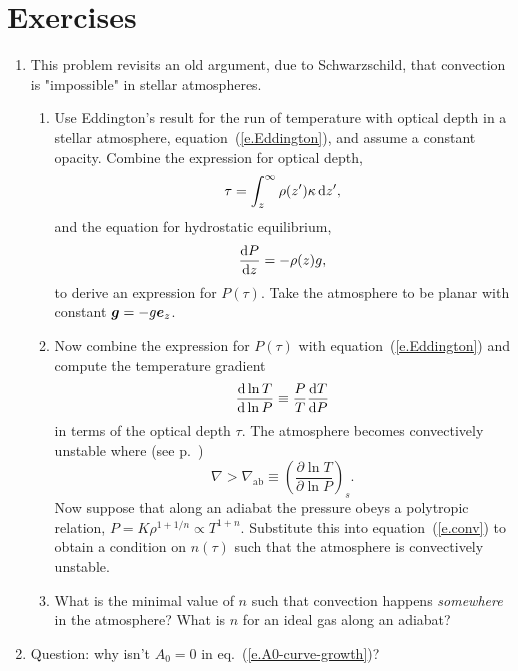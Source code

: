 \section{Exercises}
\begin{enumerate}
\item This problem revisits an old argument, due to Schwarzschild, that convection is "impossible" in stellar atmospheres.  
\begin{enumerate}
\item Use Eddington's result for the run of temperature with optical depth in a stellar atmosphere, equation~(\ref{e.Eddington}), 
and assume a constant opacity. Combine the expression for optical depth,
\[ \tau = \int_{z}^{\infty}\rho(z')\kappa\, \mathrm{d} z', \]
and the equation for hydrostatic equilibrium,
\[ \frac{\mathrm{d} P}{\mathrm{d} z} = -\rho(z)g, \]
to derive an expression for $P(\tau)$.  Take the atmosphere to be planar with constant $\boldsymbol{g} = -g\boldsymbol{e}_{z}$.

\item Now combine the expression for $P(\tau)$ with equation~(\ref{e.Eddington}) and compute the temperature gradient
\begin{equation}
\frac{\mathrm{d}\ln T}{\mathrm{d}\ln P} \equiv \frac{P}{T}\frac{\mathrm{d} T}{\mathrm{d} P}
\end{equation}
in terms of the optical depth $\tau$.  The atmosphere becomes convectively unstable where (see p.~\pageref{e.schwarzschild})
\begin{equation}\label{e.conv}
 \nabla > \nabla_{\mathrm{ab}} \equiv \left(\frac{\partial\ln T}{\partial\ln P}\right)_{s}.
\end{equation}
Now suppose that along an adiabat the pressure obeys a polytropic relation, $P = K\rho^{1+1/n} \propto T^{1+n}$. Substitute this into equation~(\ref{e.conv}) to obtain a condition on $n(\tau)$ such that the atmosphere is convectively unstable.

\item What is the minimal value of $n$ such that convection happens \emph{somewhere} in the atmosphere?  What is $n$ for an ideal gas along an adiabat?
\end{enumerate}

\item Question: why isn't $A_{0}=0$ in eq.~(\ref{e.A0-curve-growth})?

\end{enumerate}
